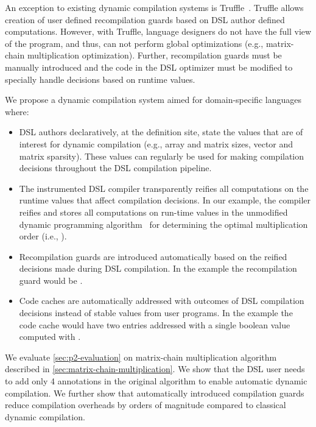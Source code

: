 An exception to existing dynamic compilation systems is Truffle~\cite{wurthinger2013one}.
 Truffle allows creation of user defined recompilation guards based on
 DSL author defined computations. However, with Truffle, language designers do not have the full view of the program,
 and thus, can not perform global optimizations (e.g., matrix-chain multiplication optimization).
 Further, recompilation guards must be manually introduced and the code in the DSL optimizer must
 be modified to specially handle decisions based on runtime values.

We propose a dynamic compilation system aimed for domain-specific languages where:
\begin{itemize}

  \item DSL authors declaratively, at the definition site, state the values that
    are of interest for dynamic compilation (e.g., array and matrix sizes, vector
    and matrix sparsity). These values can regularly be used for making
    compilation decisions throughout the DSL compilation pipeline.

  \item The instrumented DSL compiler transparently reifies all computations on
   the runtime values that affect compilation decisions. In our example,
   the compiler reifies and stores all computations on run-time values in the
   unmodified dynamic programming algorithm~\cite{cormen2001introduction} for determining the
   optimal multiplication order (i.e., ).

  \item Recompilation guards are introduced automatically based on the reified decisions made during DSL
   compilation. In the example the recompilation guard would be .

  \item Code caches are automatically addressed with outcomes of DSL compilation
   decisions instead of stable values from user programs. In the example
   the code cache would have two entries addressed with a single boolean
   value computed with .

\end{itemize}

We evaluate \ref{sec:p2-evaluation} on matrix-chain multiplication algorithm described
 in \ref{sec:matrix-chain-multiplication}. We show that the DSL user needs to add only
 4 annotations in the original algorithm to enable automatic dynamic compilation. We further
 show that automatically introduced compilation guards reduce compilation overheads by orders of magnitude
 compared to classical dynamic compilation.

